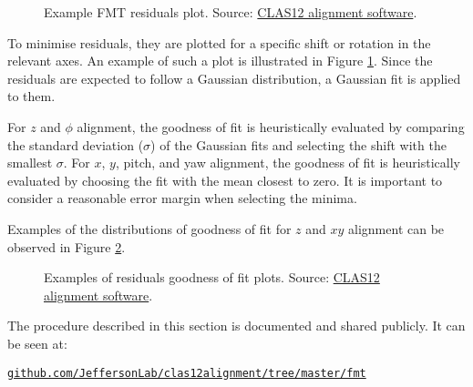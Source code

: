     \begin{figure}[b!]
        \centering{}
        \caption[Example FMT residuals plot]{Example FMT residuals plot.
        Source: \hyperlink{github.com/JeffersonLab/clas12alignment}{CLAS12 alignment software}.}
        \label{fig::12.20::fmt_residuals_example}
    \end{figure}

    To minimise residuals, they are plotted for a specific shift or rotation in the relevant axes.
    An example of such a plot is illustrated in Figure \ref{fig::12.20::fmt_residuals_example}.
    Since the residuals are expected to follow a Gaussian distribution, a Gaussian fit is applied to them.

    For $z$ and $\phi$ alignment, the goodness of fit is heuristically evaluated by comparing the standard deviation ($\sigma$) of the Gaussian fits and selecting the shift with the smallest $\sigma$.
    For $x$, $y$, pitch, and yaw alignment, the goodness of fit is heuristically evaluated by choosing the fit with the mean closest to zero.
    It is important to consider a reasonable error margin when selecting the minima.

    Examples of the distributions of goodness of fit for $z$ and $xy$ alignment can be observed in Figure \ref{fig::12.20::fmt_residuals_fit_example}.

    \begin{figure}[t!]
        \centering{}
        \caption[Examples of residuals goodness of fit plots]{Examples of residuals goodness of fit plots.
        Source: \hyperlink{github.com/JeffersonLab/clas12alignment}{CLAS12 alignment software}.}
        \label{fig::12.20::fmt_residuals_fit_example}
    \end{figure}

    
    

    The procedure described in this section is documented and shared publicly.
    It can be seen at:

    \href{github.com/JeffersonLab/clas12alignment/tree/master/fmt}{\texttt{github.com/JeffersonLab/clas12alignment/tree/master/fmt}}
